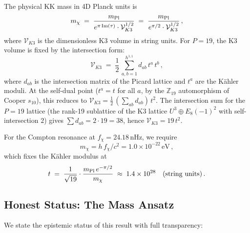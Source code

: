 The physical KK mass in 4D Planck units is
\begin{equation}
    m_\chi \;=\; \frac{m_{\rm Pl}}{e^{\pi\,\mathrm{Im}(\tau)} \cdot \mathcal{V}_{K3}^{1/2}} \;=\; \frac{m_{\rm Pl}}{e^{\pi/2} \cdot \mathcal{V}_{K3}^{1/2}}\,,
    \label{eq:physical_mass}
\end{equation}
where $\mathcal{V}_{K3}$ is the dimensionless K3 volume in string units.  For $P = 19$, the K3 volume is fixed by the intersection form:
\begin{equation}
    \mathcal{V}_{K3} \;=\; \frac{1}{2}\,\sum_{a,b=1}^{h^{1,1}} d_{ab}\, t^a\, t^b\,,
    \label{eq:K3_volume}
\end{equation}
where $d_{ab}$ is the intersection matrix of the Picard lattice and $t^a$ are the K\"ahler moduli.  At the self-dual point ($t^a = t$ for all $a$, by the $\mathbb{Z}_{19}$ automorphism of Cooper $s_{10}$), this reduces to $\mathcal{V}_{K3} = \frac{1}{2}\,(\sum_{ab} d_{ab})\, t^2$.  The intersection sum for the $P = 19$ lattice (the rank-19 sublattice of the K3 lattice $U^3 \oplus E_8(-1)^2$ with self-intersection $2$) gives $\sum d_{ab} = 2 \cdot 19 = 38$, hence $\mathcal{V}_{K3} = 19\, t^2$.

For the Compton resonance at $f_\chi = 24.18\,$nHz, we require
\begin{equation}
    m_\chi = h\, f_\chi / c^2 = 1.0 \times 10^{-22}\,\mathrm{eV}\,,
\end{equation}
which fixes the K\"ahler modulus at
\begin{equation}
    t \;=\; \frac{1}{\sqrt{19}} \cdot \frac{m_{\rm Pl}\, e^{-\pi/2}}{m_\chi} \;\approx\; 1.4 \times 10^{28}\quad(\mathrm{string\ units})\,.
    \label{eq:kahler_value}
\end{equation}

\subsection{Honest Status: The Mass Ansatz}

We state the epistemic status of this result with full transparency:

\medskip
\noindent{}
\medskip

